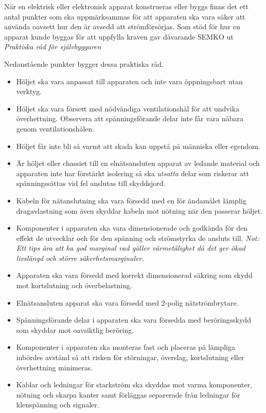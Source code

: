 När en elektrisk eller elektronisk apparat konstrueras eller byggs finns det
ett antal punkter som ska uppmärksammas för att apparaten ska vara säker att
använda oavsett hur den är avsedd att strömförsörjas.
Som stöd för hur en apparat kunde byggas för att uppfylla kraven gav
dåvarande SEMKO ut \emph{Praktiska råd för självbyggaren}

Nedanstående punkter bygger dessa praktiska råd.

\begin{itemize}
	\item Höljet ska vara anpassat till apparaten och inte vara öppningsbart
	utan verktyg.
	\item Höljet ska vara försett med nödvändiga ventilationshål för att
	undvika överhettning. Observera att spänningsförande delar inte får
	vara nåbara genom ventilationshålen.
	\item Höljet får inte bli så varmt att skada kan uppstå på människa
	eller egendom.
	\item Är höljet eller chassiet till en elnätsansluten apparat av ledande
	material och apparaten inte har förstärkt isolering så ska \emph{utsatta}
	delar som riskerar att spänningssättas vid fel anslutas till skyddsjord.
	\item Kabeln för nätanslutning ska vara försedd med en för ändamålet
	lämplig dragavlastning som även skyddar kabeln mot nötning när den
	passerar höljet.
	\item Komponenter i apparaten ska vara dimensionerade och godkända
	för den effekt de utvecklar och för den spänning och strömstyrka de
	ansluts till. \emph{Not: Ett tips ära att ha god marginal vad gäller
	värmetålighet då det ger ökad livslängd och större säkerhetsmarginaler.}
	\item Apparaten ska vara försedd med korrekt dimensionerad säkring
	som skydd mot kortslutning och överbelastning.
	\item Elnätsansluten apparat ska vara försedd med 2-polig nätströmbrytare.
	\item Spänningsförande delar i apparaten ska vara försedda med
	beröringsskydd som skyddar mot oavsiktlig beröring.
	\item Komponenter i apparaten ska monteras fast och placeras på lämpliga
	inbördes avstånd så att risken för störningar, överslag, kortslutning eller
	överhettning minimeras.
	\item Kablar och ledningar för starkström ska skyddas mot varma komponenter,
	nötning och skarpa kanter samt förläggas separerade från ledningar för
	klenspänning och signaler.
\end{itemize}

